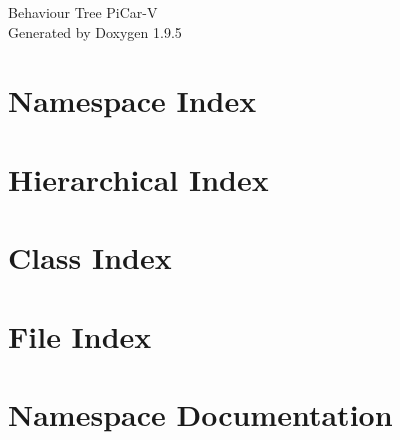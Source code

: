 \documentclass[twoside]{book}
\newcommand{\+}{\discretionary{\mbox{\scriptsize$\hookleftarrow$}}{}{}}
\newcommand{\clearemptydoublepage}{%
    \newpage{\pagestyle{empty}\cleardoublepage}%
  }
\begin{document}
  \raggedbottom
    \hypersetup{pageanchor=false,
                bookmarksnumbered=true,
                pdfencoding=unicode
               }
  \begin{titlepage}
  \vspace*{7cm}
  \begin{center}%
  {\Large Behaviour Tree Pi\+Car-\/V}\\
  \vspace*{1cm}
  {\large Generated by Doxygen 1.9.5}\\
  \end{center}
  \end{titlepage}
  \clearemptydoublepage
  \tableofcontents
  \clearemptydoublepage
  \hypersetup{pageanchor=true}
\chapter{Namespace Index}

\chapter{Hierarchical Index}

\chapter{Class Index}

\chapter{File Index}

\chapter{Namespace Documentation}











\end{document}
